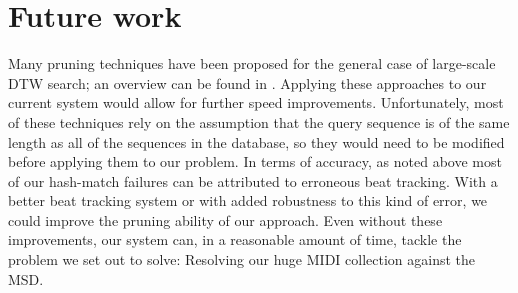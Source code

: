 \documentclass{article}
\begin{document}
\section{Future work}

Many pruning techniques have been proposed for the general case of large-scale DTW search; an overview can be found in \cite{rakthanmanon2012searching}.
Applying these approaches to our current system would allow for further speed improvements.
Unfortunately, most of these techniques rely on the assumption that the query sequence is of the same length as all of the sequences in the database, so they would need to be modified before applying them to our problem.
In terms of accuracy, as noted above most of our hash-match failures can be attributed to erroneous beat tracking.
With a better beat tracking system or with added robustness to this kind of error, we could improve the pruning ability of our approach.
Even without these improvements, our system can, in a reasonable amount of time, tackle the problem we set out to solve: Resolving our huge MIDI collection against the MSD.


\end{document}
